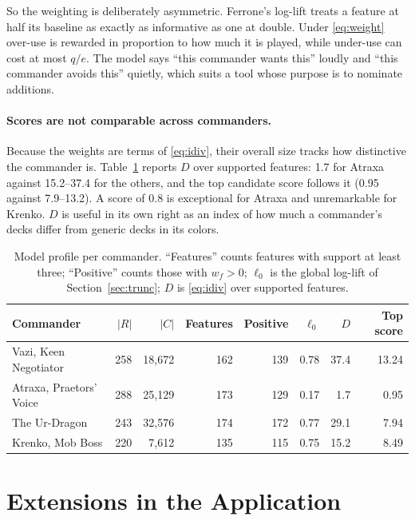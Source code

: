 \documentclass[11pt]{article}
\theoremstyle{remark}
\begin{document}
\noindent So the weighting is deliberately asymmetric. Ferrone's log-lift treats
a feature at half its baseline as exactly as informative as one at double. Under
\eqref{eq:weight} over-use is rewarded in proportion to how much it is played,
while under-use can cost at most $q/e$. The model says ``this commander wants
this'' loudly and ``this commander avoids this'' quietly, which suits a tool
whose purpose is to nominate additions.

\paragraph{Scores are not comparable across commanders.}
Because the weights are terms of \eqref{eq:idiv}, their overall size tracks how
distinctive the commander is. Table~\ref{tab:profile} reports $D$ over supported
features: 1.7 for Atraxa against 15.2--37.4 for the others, and the top candidate
score follows it (0.95 against 7.9--13.2). A score of 0.8 is exceptional for
Atraxa and unremarkable for Krenko. $D$ is useful in its own right as an index of
how much a commander's decks differ from generic decks in its colors.

\begin{table}[h]
\centering
\begin{tabular}{lrrrrrrr}
\toprule
Commander & $|R|$ & $|C|$ & Features & Positive & $\ell_0$ & $D$ & Top score\\
\midrule
Vazi, Keen Negotiator    & 258 & 18{,}672 & 162 & 139 & 0.78 & 37.4 & 13.24\\
Atraxa, Praetors' Voice  & 288 & 25{,}129 & 173 & 129 & 0.17 &  1.7 & 0.95\\
The Ur-Dragon            & 243 & 32{,}576 & 174 & 172 & 0.77 & 29.1 & 7.94\\
Krenko, Mob Boss         & 220 &  7{,}612 & 135 & 115 & 0.75 & 15.2 & 8.49\\
\bottomrule
\end{tabular}
\caption{Model profile per commander. ``Features'' counts features with support
at least three; ``Positive'' counts those with $w_f>0$; $\ell_0$ is the global
log-lift of Section~\ref{sec:trunc}; $D$ is \eqref{eq:idiv} over supported
features.}\label{tab:profile}
\end{table}

\section{Extensions in the Application}\label{sec:ext}
\end{document}

